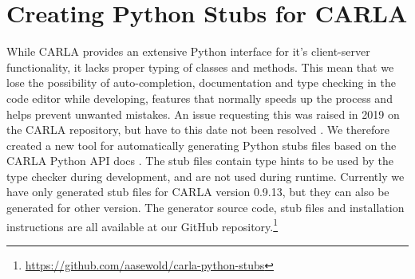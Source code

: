 \section{Creating Python Stubs for CARLA}
\label{sec:python-stubs}
While CARLA provides an extensive Python interface for it's client-server functionality, it lacks proper typing of classes and methods. This mean that we lose the possibility of auto-completion, documentation and type checking in the code editor while developing, features that normally speeds up the process and helps prevent unwanted mistakes. An issue requesting this was raised in 2019 on the CARLA repository, but have to this date not been resolved \cite{carla-python-stubs-issue}. We therefore created a new tool for automatically generating Python stubs files based on the CARLA Python API docs \cite{carla-python-api}. The stub files contain type hints to be used by the type checker during development, and are not used during runtime. Currently we have only generated stub files for CARLA version 0.9.13, but they can also be generated for other version. The generator source code, stub files and installation instructions are all available at our GitHub repository.\footnote{\url{https://github.com/aasewold/carla-python-stubs}}

